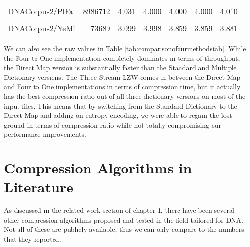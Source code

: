 \documentclass[12pt,twoside]{reedthesis}
\begin{document}
\begin{table}[!h]
{\begin{tabular}[t]{l|r|r|r|r|r|r}
\cellcolor{gray!6}{DNACorpus2/OrSa} & \cellcolor{gray!6}{43262523} & \cellcolor{gray!6}{3.843} & \cellcolor{gray!6}{4.000} & \cellcolor{gray!6}{3.858} & \cellcolor{gray!6}{3.858} & \cellcolor{gray!6}{3.908}\\
\hline
DNACorpus2/PlFa & 8986712 & 4.031 & 4.000 & 4.000 & 4.000 & 4.010\\
\hline
\cellcolor{gray!6}{DNACorpus2/ScPo} & \cellcolor{gray!6}{10652155} & \cellcolor{gray!6}{3.847} & \cellcolor{gray!6}{4.000} & \cellcolor{gray!6}{3.813} & \cellcolor{gray!6}{3.813} & \cellcolor{gray!6}{3.851}\\
\hline
DNACorpus2/YeMi & 73689 & 3.099 & 3.998 & 3.859 & 3.859 & 3.881\\
\hline
\end{tabular}}
\end{table}
We can also see the raw values in Table \ref{tab:comparisonofourmethodstab}. While the Four to One implementation completely dominates in terms of throughput, the Direct Map version is substantially faster than the Standard and Multiple Dictionary versions. The Three Stream LZW comes in between the Direct Map and Four to One implementations in terms of compression time, but it actually has the best compression ratio out of all three dictionary versions on most of the input files. This means that by switching from the Standard Dictionary to the Direct Map and adding on entropy encoding, we were able to regain the lost ground in terms of compression ratio while not totally compromising our performance improvements.

\hypertarget{compression-algorithms-in-literature}{%
\section{Compression Algorithms in Literature}\label{compression-algorithms-in-literature}}

As discussed in the related work section of chapter 1, there have been several other compression algorithms proposed and tested in the field tailored for DNA. Not all of these are publicly available, thus we can only compare to the numbers that they reported.
\end{document}
